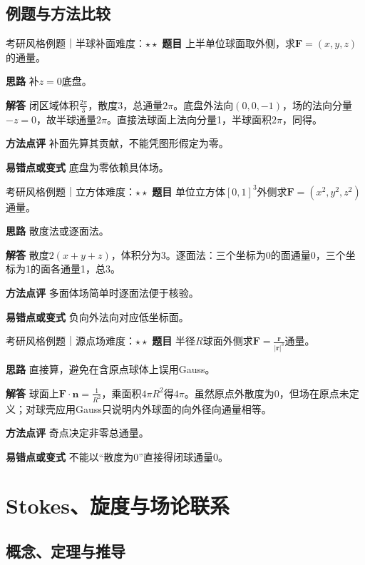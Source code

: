 \subsection{例题与方法比较}
\begin{example}{考研风格例题｜半球补面}{难度：$\star\star$}
\label{ex:8:10}\textbf{题目} 上半单位球面取外侧，求$\bm F=(x,y,z)$的通量。\par
\textbf{思路} 补$z=0$底盘。\par
\textbf{解答} 闭区域体积$\frac{2\pi}{3}$，散度3，总通量$2\pi$。底盘外法向$(0,0,-1)$，场的法向分量$-z=0$，故半球通量$2\pi$。直接法球面上法向分量1，半球面积$2\pi$，同得。\par
\textbf{方法点评} 补面先算其贡献，不能凭图形假定为零。\par
\textbf{易错点或变式} 底盘为零依赖具体场。
\end{example}
\begin{example}{考研风格例题｜立方体}{难度：$\star\star$}
\label{ex:8:11}\textbf{题目} 单位立方体$[0,1]^3$外侧求$\bm F=(x^2,y^2,z^2)$通量。\par
\textbf{思路} 散度法或逐面法。\par
\textbf{解答} 散度$2(x+y+z)$，体积分为3。逐面法：三个坐标为0的面通量0，三个坐标为1的面各通量1，总3。\par
\textbf{方法点评} 多面体场简单时逐面法便于核验。\par
\textbf{易错点或变式} 负向外法向对应低坐标面。
\end{example}
\begin{example}{考研风格例题｜源点场}{难度：$\star\star$}
\label{ex:8:12}\textbf{题目} 半径$R$球面外侧求$\bm F=\frac{\bm r}{|\bm r|^3}$通量。\par
\textbf{思路} 直接算，避免在含原点球体上误用Gauss。\par
\textbf{解答} 球面上$\bm F\cdot\bm n=\frac{1}{R^2}$，乘面积$4\pi R^2$得$4\pi$。虽然原点外散度为0，但场在原点未定义；对球壳应用Gauss只说明内外球面的向外径向通量相等。\par
\textbf{方法点评} 奇点决定非零总通量。\par
\textbf{易错点或变式} 不能以“散度为0”直接得闭球通量0。
\end{example}
\section{Stokes、旋度与场论联系}\label{sec:8:5}
\subsection{概念、定理与推导}


